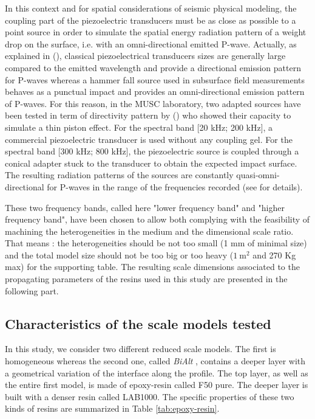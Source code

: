 \documentclass[extra,mreferee]{gji}
\newcommand{\bialt}{\textit{BiAlt} }
\begin{document}
In this context and for spatial considerations of seismic physical modeling, the coupling part of the piezoelectric transducers must be as close as possible to a point source in order to simulate the spatial energy radiation pattern of a weight drop on the surface, i.e. with an omni-directional emitted P-wave. Actually, as explained in (\cite{bretaudeau2011ssm}), classical piezoelectrical transducers sizes are generally large compared to the emitted wavelength and provide a directional emission pattern for P-waves whereas a hammer fall source used in subsurface field measurements behaves as a punctual impact and provides an omni-directional emission pattern of P-waves. For this reason, in the MUSC laboratory, two adapted sources have been tested in term of directivity pattern by (\cite{bretaudeau2011ssm})  who showed their capacity to simulate a thin piston effect. For the spectral band [20 kHz; 200 kHz], a commercial piezoelectric transducer is used without any coupling gel. For the spectral band [300 kHz; 800 kHz], the piezoelectric source is coupled through a conical adapter stuck to the transducer to obtain the expected impact surface. The resulting radiation patterns of the sources are constantly quasi-omni-directional for P-waves in the range of the frequencies recorded (see \cite{bretaudeau2011ssm} for details).

These two frequency bands, called here "lower frequency band" and "higher frequency band", have been chosen to allow both complying with the feasibility of machining the heterogeneities in the medium and the dimensional scale ratio. That means : the heterogeneities should be not too small (1 mm of minimal size) and the total model size should not be too big or too heavy ($\mathrm{1\ m^{2}}$ and 270 Kg max) for the supporting table. The resulting scale dimensions associated to the propagating parameters of the resins used in this study are presented in the following part.


\subsection{Characteristics of the scale models tested}
\label{sec:models}

In this study, we consider two different reduced scale models. The first is homogeneous whereas the second one, called \bialt, contains a deeper layer with a geometrical variation of the interface along the profile. The top layer, as well as the entire first model, is made of epoxy-resin called F50 pure. The deeper layer is built with a denser resin called LAB1000. The specific properties of these two kinds of resins are summarized in Table \ref{tab:epoxy-resin}.
\end{document}
